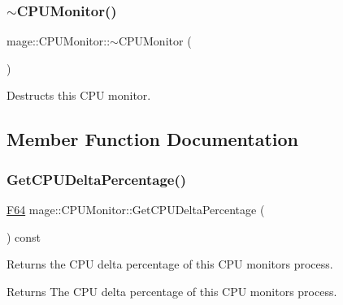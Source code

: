 \subsubsection{\texorpdfstring{$\sim$\+C\+P\+U\+Monitor()}{~CPUMonitor()}}
{\footnotesize\ttfamily mage\+::\+C\+P\+U\+Monitor\+::$\sim$\+C\+P\+U\+Monitor (\begin{DoxyParamCaption}{ }\end{DoxyParamCaption})\hspace{0.3cm}{\ttfamily [default]}}

Destructs this C\+PU monitor. 

\subsection{Member Function Documentation}
\hypertarget{classmage_1_1_c_p_u_monitor_a67a4eba9480d15855f6283ec434c215a}{}\label{classmage_1_1_c_p_u_monitor_a67a4eba9480d15855f6283ec434c215a} 
\subsubsection{\texorpdfstring{Get\+C\+P\+U\+Delta\+Percentage()}{GetCPUDeltaPercentage()}}
{\footnotesize\ttfamily \hyperlink{namespacemage_ad26233bbec640deda836e572c1a23708}{F64} mage\+::\+C\+P\+U\+Monitor\+::\+Get\+C\+P\+U\+Delta\+Percentage (\begin{DoxyParamCaption}{ }\end{DoxyParamCaption}) const\hspace{0.3cm}{\ttfamily [noexcept]}}

Returns the C\+PU delta percentage of this C\+PU monitor\textquotesingle{}s process.

\begin{DoxyReturn}{Returns}
The C\+PU delta percentage of this C\+PU monitor\textquotesingle{}s process. 
\end{DoxyReturn}
\hypertarget{classmage_1_1_c_p_u_monitor_aec7712bcef92b93d368c312168ab56bd}{}\label{classmage_1_1_c_p_u_monitor_aec7712bcef92b93d368c312168ab56bd} 
